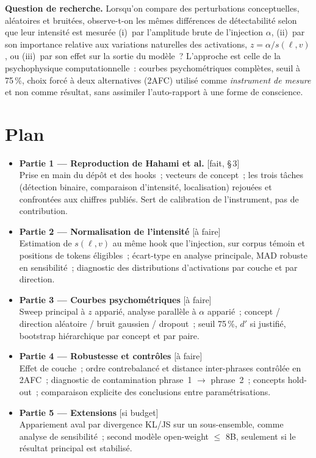 \documentclass[a4paper,10pt]{article}
\newcommand{\pc}[1]{#1\,\%}
\newcommand{\etat}[1]{{\footnotesize\textsf{[#1]}}}
\begin{document}
\medskip
\textbf{Question de recherche.} Lorsqu'on compare des perturbations conceptuelles, aléatoires et
bruitées, observe-t-on les mêmes différences de détectabilité selon que leur intensité est mesurée
(i)~par l'amplitude brute de l'injection $\alpha$, (ii)~par son importance relative aux variations
naturelles des activations, $z = \alpha / s(\ell, v)$, ou (iii)~par son effet sur la sortie du
modèle~? L'approche est celle de la psychophysique computationnelle~: courbes psychométriques
complètes, seuil à \pc{75}, choix forcé à deux alternatives (2AFC) utilisé comme
\emph{instrument de mesure} et non comme résultat, sans assimiler l'auto-rapport à une forme de
conscience.

\section{Plan}

\begin{itemize}
  \item[] \textbf{Partie 1 --- Reproduction de Hahami et al.} \etat{fait, \S\,3}\\
        Prise en main du dépôt et des hooks~; vecteurs de concept~; les trois tâches
        (détection binaire, comparaison d'intensité, localisation) rejouées et confrontées aux
        chiffres publiés. Sert de calibration de l'instrument, pas de contribution.
  \item[] \textbf{Partie 2 --- Normalisation de l'intensité} \etat{à faire}\\
        Estimation de $s(\ell, v)$ au même hook que l'injection, sur corpus témoin et positions de
        tokens éligibles~; écart-type en analyse principale, MAD robuste en sensibilité~;
        diagnostic des distributions d'activations par couche et par direction.
  \item[] \textbf{Partie 3 --- Courbes psychométriques} \etat{à faire}\\
        Sweep principal à $z$ apparié, analyse parallèle à $\alpha$ apparié~; concept /
        direction aléatoire / bruit gaussien / dropout~; seuil \pc{75}, $d'$ si justifié,
        bootstrap hiérarchique par concept et par paire.
  \item[] \textbf{Partie 4 --- Robustesse et contrôles} \etat{à faire}\\
        Effet de couche~; ordre contrebalancé et distance inter-phrases contrôlée en 2AFC~;
        diagnostic de contamination phrase~1 $\rightarrow$ phrase~2~; concepts hold-out~;
        comparaison explicite des conclusions entre paramétrisations.
  \item[] \textbf{Partie 5 --- Extensions} \etat{si budget}\\
        Appariement aval par divergence KL/JS sur un sous-ensemble, comme analyse de sensibilité~;
        second modèle open-weight $\leq$ 8B, seulement si le résultat principal est stabilisé.
\end{itemize}
\end{document}
